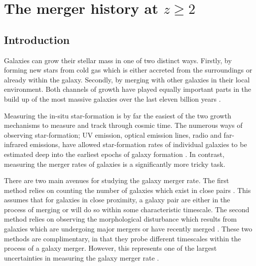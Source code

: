 \chapter{The merger history at $z \geq 2$}\label{ch:mergers}

\section{Introduction}
Galaxies can grow their stellar mass in one of two distinct ways. Firstly, by forming new stars from cold gas which is either accreted from the surroundings or already within the galaxy. Secondly, by merging with other galaxies in their local environment. Both channels of growth have played equally important parts in the build up of the most massive galaxies over the last eleven billion years \citep{Bundy:2009jw,Bridge:2010ft,Ownsworth:2014gt}.
%

Measuring the in-situ star-formation is by far the easiest of the two growth mechanisms to measure and track through cosmic time. The numerous ways of observing star-formation; UV emission, optical emission lines, radio and far-infrared emissions, have allowed star-formation rates of individual galaxies to be estimated deep into the earliest epochs of galaxy formation \citep{Hopkins:2006bq,Behroozi:2013fg,Bouwens:2014tx}. In contrast, measuring the merger rates of galaxies is a significantly more tricky task. 

There are two main avenues for studying the galaxy merger rate. The first method relies on counting the number of galaxies which exist in close pairs \citep{Patton:2000kt}. This assumes that for galaxies in close proximity, a galaxy pair are either in the process of merging or will do so within some characteristic timescale. The second method relies on observing the morphological disturbance which results from galaxies which are undergoing major mergers or have recently merged \citep{Conselice:2003jz}. These two methods are complimentary, in that they probe different timescales within the process of a galaxy merger. However, this represents one of the largest uncertainties in measuring the galaxy merger rate  \citep{Kitzbichler:2008gi,Conselice:2009bi,Lotz:2010ie,Lotz:2010hf,Hopkins:2010ip}.

